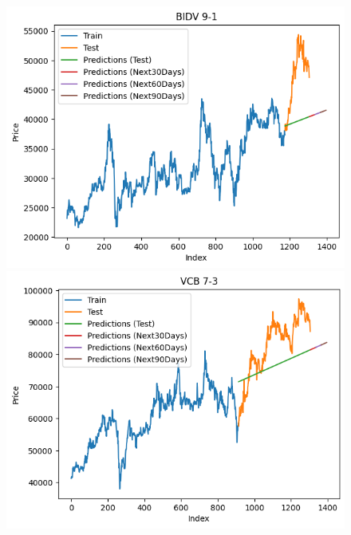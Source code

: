 \begin{figure}[H]
\begin{minipage}{0.15\textwidth}
    \end{minipage}
    \hfill
        \begin{minipage}{0.15\textwidth}
    \centering
    \includegraphics[width=1\textwidth]{resources/chapter-5/newdata1/result/BIDV_LinearRegression_9-1.png}
    \end{minipage}
    \hfill
    \begin{minipage}{0.15\textwidth}
    \centering
    \includegraphics[width=1\textwidth]{resources/chapter-5/newdata1/result/VCB_LinearRegression_7-3.png}
    \end{minipage}
    \hfill
    \begin{minipage}{0.15\textwidth}

\end{minipage}
\end{figure}
